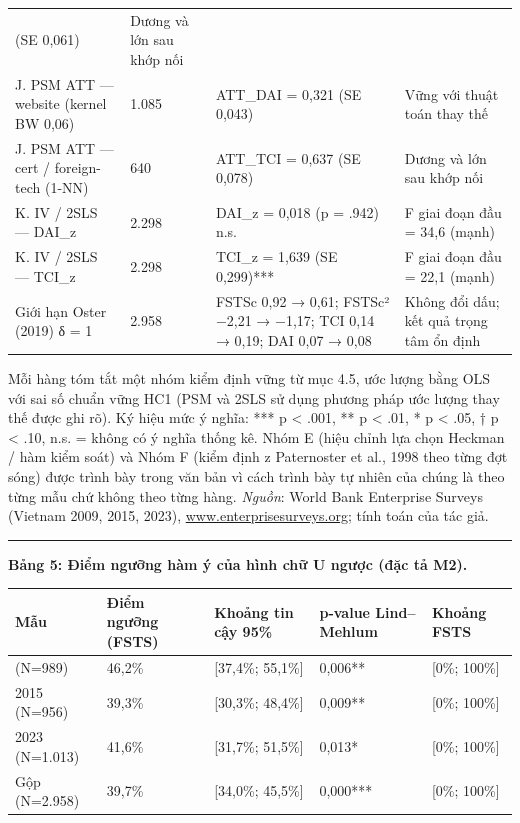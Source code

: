 \documentclass[12pt,a4paper]{article}
\begin{document}
\begin{longtable}[]{@{}llll@{}}
(SE 0,061) & Dương và lớn sau khớp nối \\
J. PSM ATT --- website (kernel BW 0,06) & 1.085 & ATT\_DAI = 0,321 (SE
0,043) & Vững với thuật toán thay thế \\
J. PSM ATT --- cert / foreign-tech (1-NN) & 640 & ATT\_TCI = 0,637 (SE
0,078) & Dương và lớn sau khớp nối \\
K. IV / 2SLS --- DAI\_z & 2.298 & DAI\_z = 0,018 (p = .942) n.s. & F
giai đoạn đầu = 34,6 (mạnh) \\
K. IV / 2SLS --- TCI\_z & 2.298 & TCI\_z = 1,639 (SE 0,299)*** & F giai
đoạn đầu = 22,1 (mạnh) \\
Giới hạn Oster (2019) δ = 1 & 2.958 & FSTSc 0,92 → 0,61; FSTSc² −2,21 →
−1,17; TCI 0,14 → 0,19; DAI 0,07 → 0,08 & Không đổi dấu; kết quả trọng
tâm ổn định \\
\end{longtable}

Mỗi hàng tóm tắt một nhóm kiểm định vững từ mục 4.5, ước lượng bằng OLS
với sai số chuẩn vững HC1 (PSM và 2SLS sử dụng phương pháp ước lượng
thay thế được ghi rõ). Ký hiệu mức ý nghĩa: *** p \textless{} .001, ** p
\textless{} .01, * p \textless{} .05, † p \textless{} .10, n.s. = không
có ý nghĩa thống kê. Nhóm E (hiệu chỉnh lựa chọn Heckman / hàm kiểm
soát) và Nhóm F (kiểm định z Paternoster et al., 1998 theo từng đợt
sóng) được trình bày trong văn bản vì cách trình bày tự nhiên của chúng
là theo từng mẫu chứ không theo từng hàng. \emph{Nguồn}: World Bank
Enterprise Surveys (Vietnam 2009, 2015, 2023),
\href{http://www.enterprisesurveys.org;}{www.enterprisesurveys.org;}
tính toán của tác giả.

\begin{center}\rule{0.5\linewidth}{0.5pt}\end{center}

\textbf{Bảng 5: Điểm ngưỡng hàm ý của hình chữ U ngược (đặc tả M2).}

\begin{longtable}[]{@{}lllll@{}}
\toprule\noalign{}
Mẫu & Điểm ngưỡng (FSTS) & Khoảng tin cậy 95\% & p-value Lind--Mehlum &
Khoảng FSTS \\
\midrule\noalign{}
\endhead
\bottomrule\noalign{}
\endlastfoot
2009 (N=989) & 46,2\% & {[}37,4\%; 55,1\%{]} & 0,006** & {[}0\%;
100\%{]} \\
2015 (N=956) & 39,3\% & {[}30,3\%; 48,4\%{]} & 0,009** & {[}0\%;
100\%{]} \\
2023 (N=1.013) & 41,6\% & {[}31,7\%; 51,5\%{]} & 0,013* & {[}0\%;
100\%{]} \\
Gộp (N=2.958) & 39,7\% & {[}34,0\%; 45,5\%{]} & 0,000*** & {[}0\%;
100\%{]} \\
\end{longtable}
\end{document}
